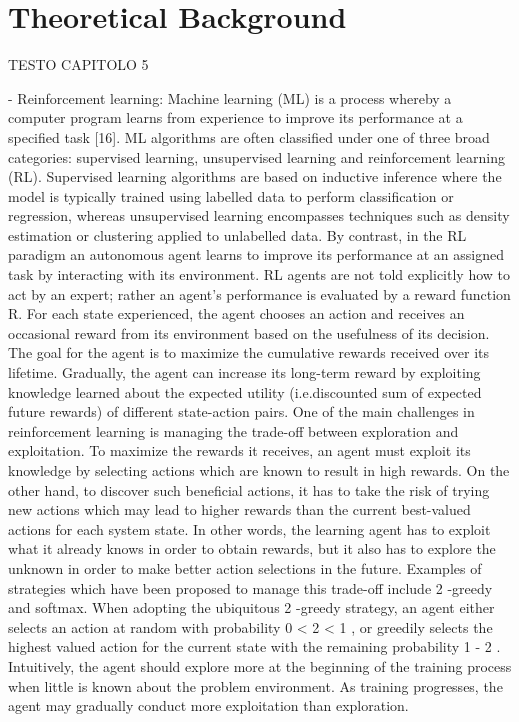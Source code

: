 \chapter{Theoretical Background}
\label{Theoretical Background}
\thispagestyle{empty}

TESTO CAPITOLO 5


- Reinforcement learning:
Machine learning (ML) is a process whereby a computer program learns from experience to improve its performance at a specified task [16]. ML algorithms are often classified under
one of three broad categories: supervised learning, unsupervised learning and reinforcement learning (RL). Supervised learning algorithms are based on inductive inference where the model is typically trained using labelled data to perform classification or regression, whereas unsupervised learning encompasses techniques such as density estimation or clustering applied to unlabelled data. By contrast, in the RL paradigm an autonomous agent learns to improve its performance at an assigned task by interacting with its environment.
RL agents are not told explicitly how to act by an expert; rather an agent's performance is evaluated by a reward function R. For each state experienced, the agent chooses an action and receives an occasional reward from its environment based on the usefulness of its decision. The goal for the agent is to maximize the cumulative rewards received over its lifetime. Gradually, the agent can increase its long-term reward by exploiting knowledge learned about the expected utility (i.e.discounted sum of expected future rewards) of different state-action pairs. One of the main challenges in reinforcement learning is managing the trade-off between exploration and exploitation. To maximize the rewards it receives, an agent must exploit its knowledge by selecting actions which are known to result in high rewards. On the other hand, to discover such beneficial actions, it has to take the risk of trying new actions which may lead to higher rewards than the current best-valued actions for each system state. In other words, the learning agent has to exploit what it already knows in order to obtain rewards, but it also has to explore the unknown in order to make better action selections in the future. Examples of strategies which have been proposed to manage this trade-off include 2 -greedy and softmax. When adopting the ubiquitous 2 -greedy strategy, an agent either selects an action at random with probability 0 < 2 < 1 , or greedily selects the highest valued action for the current state with the remaining probability 1 - 2 . Intuitively, the agent should explore more at the beginning of the training process when little is known about the problem environment. As training progresses, the agent may gradually conduct more exploitation than exploration.

